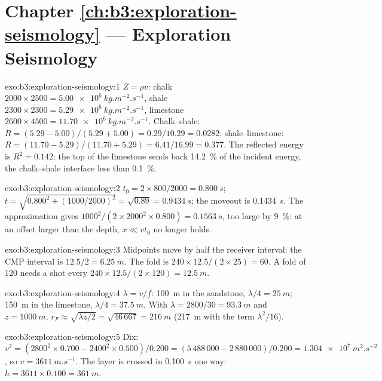 \section*{Chapter \ref{ch:b3:exploration-seismology} --- Exploration Seismology}

\begin{solution}{exo:b3:exploration-seismology:1}
$Z = \rho v$: chalk $2000\times2500 = \qty{5.00e6}{kg.m^{-2}.s^{-1}}$, shale
$2300\times2300 = \qty{5.29e6}{kg.m^{-2}.s^{-1}}$, limestone $2600\times4500 =
\qty{11.70e6}{kg.m^{-2}.s^{-1}}$. Chalk--shale: $R = (5.29 - 5.00)/(5.29 + 5.00)
= 0.29/10.29 = 0.0282$; shale--limestone: $R = (11.70 - 5.29)/(11.70 + 5.29) =
6.41/16.99 = 0.377$. The reflected energy is $R^2 = 0.142$: the top of the
limestone sends back \qty{14.2}{\percent} of the incident energy, the chalk--shale
interface less than \qty{0.1}{\percent}.
\end{solution}

\begin{solution}{exo:b3:exploration-seismology:2}
$t_0 = 2\times800/2000 = \qty{0.800}{s}$; $t = \sqrt{0.800^2 + (1000/2000)^2} =
\sqrt{0.89} = \qty{0.9434}{s}$; the moveout is \qty{0.1434}{s}. The
approximation gives $1000^2/(2\times2000^2\times0.800) = \qty{0.1563}{s}$, too
large by \qty{9}{\percent}: at an offset larger than the depth, $x \ll vt_0$ no
longer holds.
\end{solution}

\begin{solution}{exo:b3:exploration-seismology:3}
Midpoints move by half the receiver interval: the CMP interval is
$12.5/2 = \qty{6.25}{m}$. The fold is $240\times12.5/(2\times25) = 60$. A fold of
120 needs a shot every $240\times12.5/(2\times120) = \qty{12.5}{m}$.
\end{solution}

\begin{solution}{exo:b3:exploration-seismology:4}
$\lambda = v/f$: \qty{100}{m} in the sandstone, $\lambda/4 = \qty{25}{m}$;
\qty{150}{m} in the limestone, $\lambda/4 = \qty{37.5}{m}$. With
$\lambda = 2800/30 = \qty{93.3}{m}$ and $z = \qty{1000}{m}$,
$r_F \approx \sqrt{\lambda z/2} = \sqrt{46\,667} = \qty{216}{m}$ (\qty{217}{m}
with the term $\lambda^2/16$).
\end{solution}

\begin{solution}{exo:b3:exploration-seismology:5}
Dix: $v^2 = (2800^2\times0.700 - 2400^2\times0.500)/0.200 = (5\,488\,000 -
2\,880\,000)/0.200 = \qty{1.304e7}{m^2.s^{-2}}$, so $v = \qty{3611}{m.s^{-1}}$.
The layer is crossed in \qty{0.100}{s} one way: $h = 3611\times0.100 =
\qty{361}{m}$.
\end{solution}

